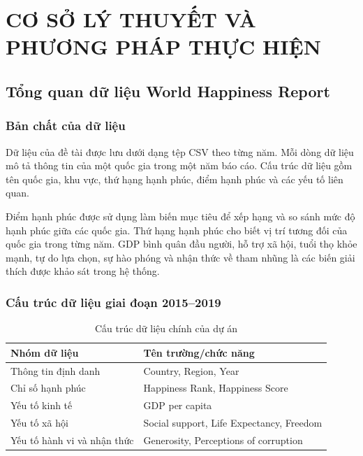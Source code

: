 \chapter{CƠ SỞ LÝ THUYẾT VÀ PHƯƠNG PHÁP THỰC HIỆN}

\section{Tổng quan dữ liệu World Happiness Report}

\subsection{Bản chất của dữ liệu}

Dữ liệu của đề tài được lưu dưới dạng tệp CSV theo từng năm. Mỗi dòng dữ liệu mô tả thông tin của một quốc gia trong một năm báo cáo. Cấu trúc dữ liệu gồm tên quốc gia, khu vực, thứ hạng hạnh phúc, điểm hạnh phúc và các yếu tố liên quan.

Điểm hạnh phúc được sử dụng làm biến mục tiêu để xếp hạng và so sánh mức độ hạnh phúc giữa các quốc gia. Thứ hạng hạnh phúc cho biết vị trí tương đối của quốc gia trong từng năm. GDP bình quân đầu người, hỗ trợ xã hội, tuổi thọ khỏe mạnh, tự do lựa chọn, sự hào phóng và nhận thức về tham nhũng là các biến giải thích được khảo sát trong hệ thống.

\subsection{Cấu trúc dữ liệu giai đoạn 2015--2019}

\begin{table}[H]
\centering
\begin{tabular}{|p{4cm}|p{8.5cm}|}
\hline
\textbf{Nhóm dữ liệu} & \textbf{Tên trường/chức năng} \\
\hline
Thông tin định danh & Country, Region, Year \\
\hline
Chỉ số hạnh phúc & Happiness Rank, Happiness Score \\
\hline
Yếu tố kinh tế & GDP per capita \\
\hline
Yếu tố xã hội & Social support, Life Expectancy, Freedom \\
\hline
Yếu tố hành vi và nhận thức & Generosity, Perceptions of corruption \\
\hline
\end{tabular}
\caption{Cấu trúc dữ liệu chính của dự án}
\label{tab:co-cau-du-lieu}
\end{table}

